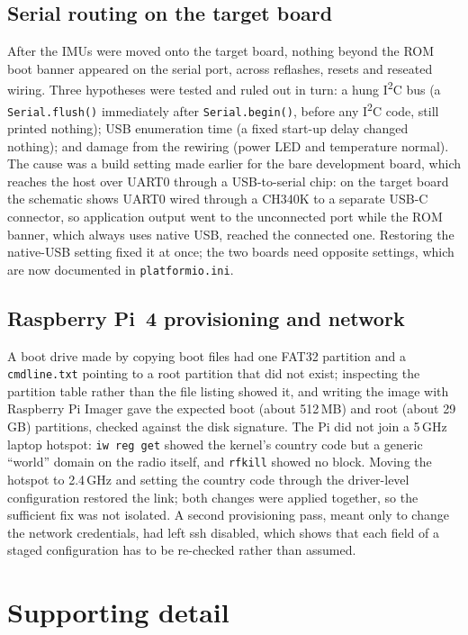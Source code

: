 \subsection*{Serial routing on the target board}

After the IMUs were moved onto the target board, nothing beyond the ROM boot banner appeared on the serial port, across reflashes, resets and reseated wiring. Three hypotheses were tested and ruled out in turn: a hung I\textsuperscript{2}C bus (a \texttt{Serial.flush()} immediately after \texttt{Serial.begin()}, before any I\textsuperscript{2}C code, still printed nothing); USB enumeration time (a fixed start-up delay changed nothing); and damage from the rewiring (power LED and temperature normal). The cause was a build setting made earlier for the bare development board, which reaches the host over UART0 through a USB-to-serial chip: on the target board the schematic shows UART0 wired through a CH340K to a separate USB-C connector, so application output went to the unconnected port while the ROM banner, which always uses native USB, reached the connected one. Restoring the native-USB setting fixed it at once; the two boards need opposite settings, which are now documented in \texttt{platformio.ini}.

\subsection*{Raspberry Pi~4 provisioning and network}

A boot drive made by copying boot files had one FAT32 partition and a \texttt{cmdline.txt} pointing to a root partition that did not exist; inspecting the partition table rather than the file listing showed it, and writing the image with Raspberry Pi Imager gave the expected boot (about 512\,MB) and root (about 29\,GB) partitions, checked against the disk signature. The Pi did not join a 5\,GHz laptop hotspot: \texttt{iw reg get} showed the kernel's country code but a generic ``world'' domain on the radio itself, and \texttt{rfkill} showed no block. Moving the hotspot to 2.4\,GHz and setting the country code through the driver-level configuration restored the link; both changes were applied together, so the sufficient fix was not isolated. A second provisioning pass, meant only to change the network credentials, had left ssh disabled, which shows that each field of a staged configuration has to be re-checked rather than assumed.

\section{Supporting detail}


